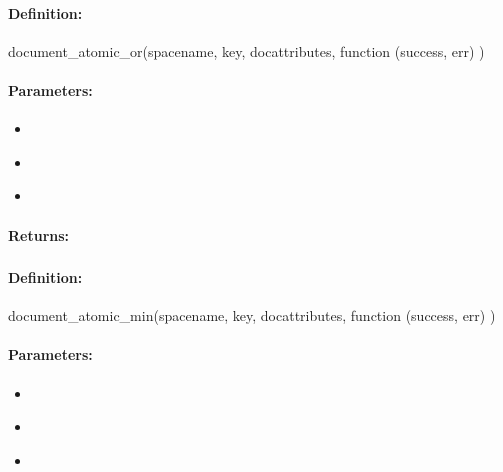 \paragraph{Definition:}
\begin{javascriptcode}
document_atomic_or(spacename, key, docattributes, function (success, err) {})
\end{javascriptcode}
\paragraph{Parameters:}
\begin{itemize}[noitemsep]
\item {}\\

\item {}\\

\item {}\\

\end{itemize}

\paragraph{Returns:}


\pagebreak
\subsubsection{}
\label{api:nodejs:document_atomic_min}


\paragraph{Definition:}
\begin{javascriptcode}
document_atomic_min(spacename, key, docattributes, function (success, err) {})
\end{javascriptcode}
\paragraph{Parameters:}
\begin{itemize}[noitemsep]
\item {}\\

\item {}\\

\item {}\\

\end{itemize}

